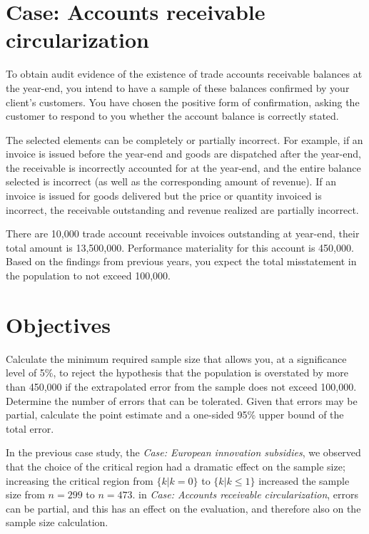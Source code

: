 \begin{mdframed}[hidealllines=true,backgroundcolor=KPMG_blue!10]
\sloppy
\section*{Case: Accounts receivable circularization}

To obtain audit evidence of the existence of trade accounts receivable balances at the year-end, you intend to have a sample of these balances confirmed by your client's customers. You have chosen the positive form of confirmation, asking the customer to respond to you whether the account balance is correctly stated.

The selected elements can be completely or partially incorrect. For example, if an invoice is issued before the year-end and goods are dispatched after the year-end, the receivable is incorrectly accounted for at the year-end, and the entire balance selected is incorrect (as well as the corresponding amount of revenue). If an invoice is issued for goods delivered but the price or quantity invoiced is incorrect, the receivable outstanding and revenue realized are partially incorrect.

\bigskip
There are 10,000 trade account receivable invoices outstanding at year-end, their total amount is 13,500,000. Performance materiality for this account is 450,000. Based on the findings from previous years, you expect the total misstatement in the population to not exceed 100,000.

\section*{Objectives}
Calculate the minimum required sample size that allows you, at a significance level of 5\%, to reject the hypothesis that the population is overstated by more than 450,000 if the extrapolated error from the sample does not exceed 100,000. Determine the number of errors that can be tolerated. Given that errors may be partial, calculate the point estimate and a one-sided 95\% upper bound of the total error.

\end{mdframed}

In the previous case study, the \emph{Case: European innovation subsidies}, we observed that the choice of the critical region had a dramatic effect on the sample size; increasing the critical region from $\{k | k = 0\}$ to $\{k | k \leq 1\}$ increased the sample size from $n = 299$ to $n = 473$. in \emph{Case: Accounts receivable circularization}, errors can be partial, and this has an effect on the evaluation, and therefore also on the sample size calculation.

